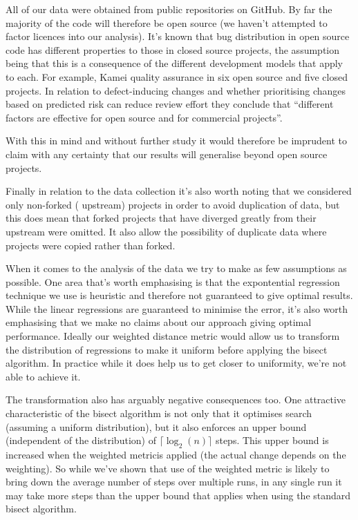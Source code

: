 \documentclass[10pt,journal,compsoc]{IEEEtran}
\begin{document}
All of our data were obtained from public repositories on GitHub. By far the majority of the code will therefore be open source (we haven't attempted to factor licences into our analysis). It's known that bug distribution in open source code has different properties to those in closed source projects, the assumption being that this is a consequence of the different development models that apply to each. For example, Kamei \etal \cite{kamei2013} quality assurance in six open source and five closed projects. In relation to defect-inducing changes and whether prioritising changes based on predicted risk can reduce review effort they conclude that ``different factors are effective for open source and for commercial projects''.

With this in mind and without further study it would therefore be imprudent to claim with any certainty that our results will generalise beyond open source projects.

Finally in relation to the data collection it's also worth noting that we considered only non-forked (\ie\/ upstream) projects in order to avoid duplication of data, but this does mean that forked projects that have diverged greatly from their upstream were omitted. It also allow the possibility of duplicate data where projects were copied rather than forked.

When it comes to the analysis of the data we try to make as few assumptions as possible. One area that's worth emphasising is that the expontential regression technique we use is heuristic and therefore not guaranteed to give optimal results. While the linear regressions are guaranteed to minimise the error, it's also worth emphasising that we make no claims about our approach giving optimal performance. Ideally our weighted distance metric would allow us to transform the distribution of regressions to make it uniform before applying the bisect algorithm. In practice while it does help us to get closer to uniformity, we're not able to achieve it.

The transformation also has arguably negative consequences too. One attractive characteristic of the bisect algorithm is not only that it optimises search (assuming a uniform distribution), but it also enforces an upper bound (independent of the distribution) of $\lceil \log_2(n) \rceil$ steps. This upper bound is increased when the weighted metricis applied (the actual change depends on the weighting). So while we've shown that use of the weighted metric is likely to bring down the average number of steps over multiple runs, in any single run it may take more steps than the upper bound that applies when using the standard bisect algorithm.
\end{document}
